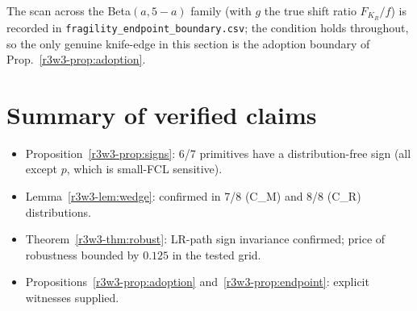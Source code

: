 The scan across the Beta$(a,5-a)$ family (with $g$ the true shift ratio
$F_{K_R}/f$) is recorded in \texttt{fragility\_endpoint\_boundary.csv};
the condition holds throughout, so the only genuine knife-edge in this
section is the adoption boundary of Prop.~\ref{r3w3-prop:adoption}.

\section*{Summary of verified claims}
\begin{itemize}
\item Proposition~\ref{r3w3-prop:signs}: 6/7 primitives have a distribution-free
sign (all except $p$, which is small-FCL sensitive).
\item Lemma~\ref{r3w3-lem:wedge}: confirmed in 7/8 (C\_M) and 8/8 (C\_R) distributions.
\item Theorem~\ref{r3w3-thm:robust}: LR-path sign invariance confirmed; price of
robustness bounded by $0.125$ in the tested grid.
\item Propositions~\ref{r3w3-prop:adoption} and~\ref{r3w3-prop:endpoint}: explicit
witnesses supplied.
\end{itemize}
